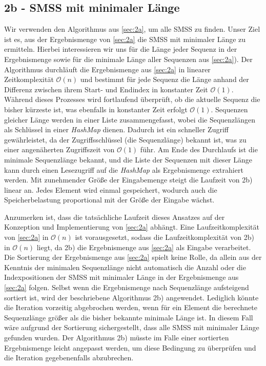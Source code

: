 \documentclass[10pt]{article}
\begin{document}
\subsection{2b - SMSS mit minimaler Länge}\label{sec:2b}
Wir verwenden den Algorithmus aus \ref{sec:2a}, um alle SMSS zu finden. 
Unser Ziel ist es, aus der Ergebnismenge von \ref{sec:2a} die SMSS mit minimaler Länge zu ermitteln. 
Hierbei interessieren wir uns für die Länge jeder Sequenz in der Ergebnismenge sowie für 
die minimale Länge aller Sequenzen aus \ref{sec:2a}).
Der Algorithmus durchläuft die Ergebnismenge aus \ref{sec:2a} in linearer Zeitkomplexität $\mathcal{O}(n)$ 
und bestimmt für jede Sequenz die Länge anhand der Differenz zwischen ihrem Start- und Endindex in 
konstanter Zeit $\mathcal{O}(1)$. Während dieses Prozesses wird fortlaufend überprüft, 
ob die aktuelle Sequenz die bisher kürzeste ist, was ebenfalls in konstanter Zeit erfolgt $\mathcal{O}(1)$. 
Sequenzen gleicher Länge werden in einer Liste zusammengefasst, wobei die Sequenzlängen als Schlüssel 
in einer \textit{HashMap} dienen. Dadurch ist ein schneller Zugriff gewährleistet, 
da der Zugriffsschlüssel (die Sequenzlänge) bekannt ist, was zu einer angenäherten Zugriffszeit von 
$\mathcal{O}(1)$ führ.
Am Ende des Durchlaufs ist die minimale Sequenzlänge bekannt, und die Liste der Sequenzen mit dieser 
Länge kann durch einen Lesezugriff auf die \textit{HashMap} als Ergebnismenge extrahiert werden.
Mit zunehmender Größe der Eingabemenge steigt die Laufzeit von 2b) linear an. 
Jedes Element wird einmal gespeichert, wodurch auch die Speicherbelastung proportional mit der 
Größe der Eingabe wächst.

Anzumerken ist, dass die tatsächliche Laufzeit dieses Ansatzes auf der Konzeption und Implementierung 
von \ref{sec:2a} abhängt. 
Eine Laufzeitkomplexität von \ref{sec:2a} in $\mathcal{O}(n)$ ist vorausgesetzt, sodass die 
Laufzeitkomplexität von 2b) in $\mathcal{O}(n)$ liegt, da 2b) die Ergebnismenge 
aus \ref{sec:2a} als Eingabe verarbeitet.
Die Sortierung der Ergebnismenge aus \ref{sec:2a} spielt keine Rolle, da allein aus der Kenntnis der minimalen 
Sequenzlänge nicht automatisch die Anzahl oder die Indexpositionen der SMSS mit minimaler Länge in 
der Ergebnismenge aus \ref{sec:2a} folgen. 
Selbst wenn die Ergebnismenge nach Sequenzlänge aufsteigend sortiert ist, wird der beschriebene 
Algorithmus 2b) angewendet. Lediglich könnte die Iteration vorzeitig abgebrochen werden, 
wenn für ein Element die berechnete Sequenzlänge größer als die bisher bekannte minimale Länge ist. 
In diesem Fall wäre aufgrund der Sortierung sichergestellt, dass alle SMSS mit minimaler 
Länge gefunden wurden. Der Algorithmus 2b) müsste im Falle einer sortierten Ergebnismenge leicht 
angepasst werden, um diese Bedingung zu überprüfen und die Iteration gegebenenfalls abzubrechen.
\end{document}
